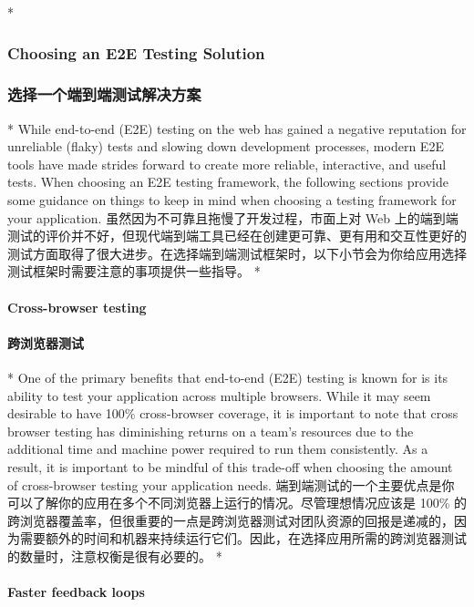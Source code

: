 \begin{paracol}{2}
 
\switchcolumn[0]*%
\subsubsection{Choosing an E2E Testing Solution}
\switchcolumn
\subsubsection{选择一个端到端测试解决方案}
\switchcolumn[0]*%
While end-to-end (E2E) testing on the web has gained a negative
reputation for unreliable (flaky) tests and slowing down development
processes, modern E2E tools have made strides forward to create more
reliable, interactive, and useful tests. When choosing an E2E testing
framework, the following sections provide some guidance on things to
keep in mind when choosing a testing framework for your application.
\switchcolumn
虽然因为不可靠且拖慢了开发过程，市面上对 Web
上的端到端测试的评价并不好，但现代端到端工具已经在创建更可靠、更有用和交互性更好的测试方面取得了很大进步。在选择端到端测试框架时，以下小节会为你给应用选择测试框架时需要注意的事项提供一些指导。
\switchcolumn[0]*%
\paragraph{Cross-browser testing}
\switchcolumn
\paragraph{跨浏览器测试}
\switchcolumn[0]*%
One of the primary benefits that end-to-end (E2E) testing is known for
is its ability to test your application across multiple browsers. While
it may seem desirable to have 100\% cross-browser coverage, it is
important to note that cross browser testing has diminishing returns on
a team's resources due to the additional time and machine power required
to run them consistently. As a result, it is important to be mindful of
this trade-off when choosing the amount of cross-browser testing your
application needs.
\switchcolumn
端到端测试的一个主要优点是你可以了解你的应用在多个不同浏览器上运行的情况。尽管理想情况应该是
100\%
的跨浏览器覆盖率，但很重要的一点是跨浏览器测试对团队资源的回报是递减的，因为需要额外的时间和机器来持续运行它们。因此，在选择应用所需的跨浏览器测试的数量时，注意权衡是很有必要的。
\switchcolumn[0]*%
\paragraph{Faster feedback loops}
\switchcolumn

\end{paracol}
